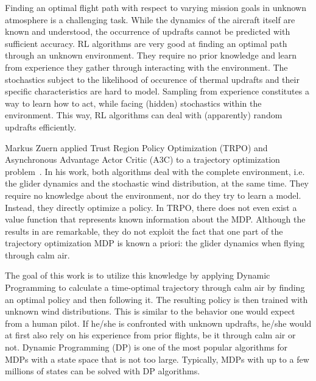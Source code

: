 Finding an optimal flight path with respect to varying mission goals in unknown atmosphere is a challenging task. While the dynamics of the aircraft itself are known and understood, the occurrence of updrafts cannot be predicted with sufficient accuracy. RL algorithms are very good at finding an optimal path through an unknown environment. They require no prior knowledge and learn from experience they gather through interacting with the environment. The stochastics subject to the likelihood of occurence of thermal updrafts and their specific characteristics are hard to model. Sampling from experience constitutes a way to learn how to act, while facing (hidden) stochastics within the environment. This way, RL algorithms can deal with (apparently) random updrafts efficiently.

Markus Zuern applied Trust Region Policy Optimization (TRPO) and Asynchronous Advantage Actor Critic (A3C) to a trajectory optimization problem~\cite{Zuern2017}. In his work, both algorithms deal with the complete environment, i.e. the glider dynamics and the stochastic wind distribution, at the same time. They require no knowledge about the environment, nor do they try to learn a model. Instead, they directly optimize a policy. In TRPO, there does not even exist a value function that represents known information about the MDP. Although the results in \cite{Zuern2017} are remarkable, they do not exploit the fact that one part of the trajectory optimization MDP is known a priori: the glider dynamics when flying through calm air.

The goal of this work is to utilize this knowledge by applying Dynamic Programming to calculate a time-optimal trajectory through calm air by finding an optimal policy and then following it. The resulting policy is then trained with unknown wind distributions. This is similar to the behavior one would expect from a human pilot. If he/she is confronted with unknown updrafts, he/she would at first also rely on his experience from prior flights, be it through calm air or not. Dynamic Programming (DP) is one of the most popular algorithms for MDPs with a state space that is not too large. Typically, MDPs with up to a few millions of states can be solved with DP algorithms.

